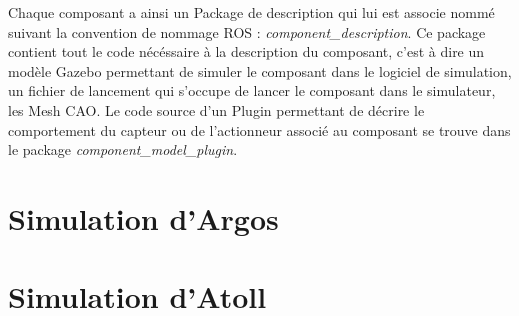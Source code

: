 		Chaque composant a ainsi un \gls{Package} de description qui lui est associe nommé suivant la convention de nommage \gls{ROS} : \textit{component\_description}. Ce package contient tout le code nécéssaire à la description du composant, c'est à dire un modèle \gls{Gazebo} permettant de simuler le composant dans le logiciel de simulation, un fichier de lancement qui s'occupe de lancer le composant dans le simulateur, les \gls{Mesh CAO}. Le code source d'un \gls{Plugin} permettant de décrire le comportement du capteur ou de l'actionneur associé au composant se trouve dans le package \textit{component\_model\_plugin}.

	\section{Simulation d'Argos}

	\section{Simulation d'Atoll}